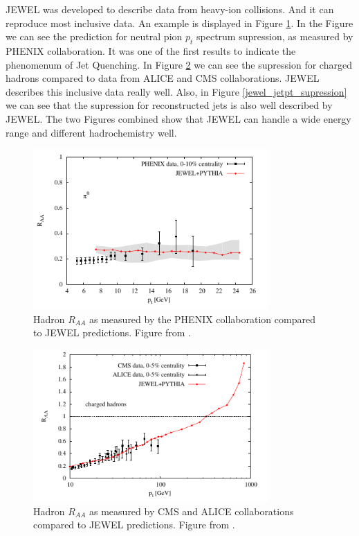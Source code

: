 
JEWEL was developed to describe data from heavy-ion collisions. And it can reproduce most inclusive data. An example is displayed in Figure \ref{hadron_supression}. In the Figure we can see the prediction for neutral pion $p_t$ spectrum supression, as measured by PHENIX collaboration. It was one of the first results to indicate the phenomenum of Jet Quenching. In Figure \ref{charged_hadron_supression} we can see the supression for charged hadrons compared to data from ALICE and CMS collaborations. JEWEL describes this inclusive data really well. Also, in Figure \ref{jewel_jetpt_supression} we can see that the supression for reconstructed jets is also well described by JEWEL. The two Figures combined show that JEWEL can handle a wide energy range and different hadrochemistry well.

\begin{figure}
\includegraphics[width=0.8\textwidth]{images/hadron_supression.png}
\caption[Hadron $R_{AA}$]{Hadron $R_{AA}$ as measured by the PHENIX collaboration compared to JEWEL predictions. Figure from \cite{zapp_perturbative_2013}.}
\label{hadron_supression}
\end{figure}

\begin{figure}
\includegraphics[width=0.8\textwidth]{images/charged_hadron_supression.png}
\caption[Charged Hadron $R_{AA}$]{Hadron $R_{AA}$ as measured by CMS and ALICE collaborations compared to JEWEL predictions. Figure from \cite{zapp_perturbative_2013}.}
\label{charged_hadron_supression}
\end{figure}

